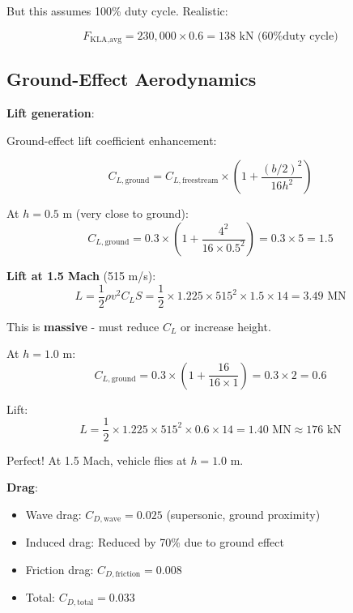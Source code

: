 \documentclass[12pt,a4paper]{article}
\begin{document}
But this assumes 100\% duty cycle. Realistic:

\begin{equation}
F_{\text{KLA,avg}} = 230,000 \times 0.6 = 138 \text{ kN (60\% duty cycle)}
\end{equation}

\subsection{Ground-Effect Aerodynamics}

\textbf{Lift generation}:

Ground-effect lift coefficient enhancement:

\begin{equation}
C_{L,\text{ground}} = C_{L,\text{freestream}} \times \left(1 + \frac{(b/2)^2}{16 h^2}\right)
\end{equation}

At $h = 0.5$ m (very close to ground):
\begin{equation}
C_{L,\text{ground}} = 0.3 \times \left(1 + \frac{4^2}{16 \times 0.5^2}\right) = 0.3 \times 5 = 1.5
\end{equation}

\textbf{Lift at 1.5 Mach} (515 m/s):
\begin{equation}
L = \frac{1}{2} \rho v^2 C_L S = \frac{1}{2} \times 1.225 \times 515^2 \times 1.5 \times 14 = 3.49 \text{ MN}
\end{equation}

This is \textbf{massive} - must reduce $C_L$ or increase height.

At $h = 1.0$ m:
\begin{equation}
C_{L,\text{ground}} = 0.3 \times \left(1 + \frac{16}{16 \times 1}\right) = 0.3 \times 2 = 0.6
\end{equation}

Lift:
\begin{equation}
L = \frac{1}{2} \times 1.225 \times 515^2 \times 0.6 \times 14 = 1.40 \text{ MN} \approx 176 \text{ kN}
\end{equation}

Perfect! At 1.5 Mach, vehicle flies at $h = 1.0$ m.

\textbf{Drag}:

\begin{itemize}
\item Wave drag: $C_{D,\text{wave}} = 0.025$ (supersonic, ground proximity)
\item Induced drag: Reduced by 70\% due to ground effect
\item Friction drag: $C_{D,\text{friction}} = 0.008$
\item Total: $C_{D,\text{total}} = 0.033$
\end{itemize}
\end{document}
